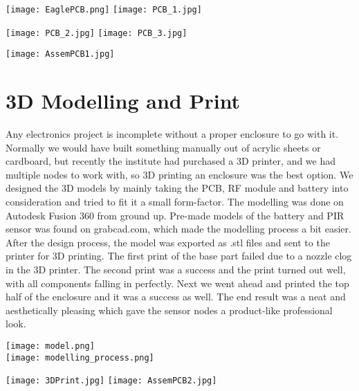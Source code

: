 \begin{center}
	\texttt{[image: EaglePCB.png]}
	\texttt{[image: PCB\_1.jpg]}
	
	\texttt{[image: PCB\_2.jpg]}
	\texttt{[image: PCB\_3.jpg]}
	
	\texttt{[image: AssemPCB1.jpg]}
\end{center}


\section{3D Modelling and Print}
Any electronics project is incomplete without a proper enclosure to go with it. Normally we would have built something manually out of acrylic sheets or cardboard, but recently the institute had purchased a 3D printer, and we had multiple nodes to work with, so 3D printing an enclosure was the best option. 
We designed the 3D models by mainly taking the PCB, RF module and battery into consideration and tried to fit it a small form-factor. The modelling was done on Autodesk Fusion 360 from ground up. Pre-made models of the battery and PIR sensor was found on grabcad.com, which made the modelling process a bit easier.
After the design process, the model was exported as .stl files and sent to the printer for 3D printing. The first print of the base part failed due to a nozzle clog in the 3D printer. The second print was a success and the print turned out well, with all components falling in perfectly. Next we went ahead and printed the top half of the enclosure and it was a success as well.
The end result was a neat and aesthetically pleasing which gave the sensor nodes a product-like professional look.

\begin{center}
	\texttt{[image: model.png]}
	\\
	\texttt{[image: modelling\_process.png]}
	
	\texttt{[image: 3DPrint.jpg]}
	\texttt{[image: AssemPCB2.jpg]}
\end{center}

